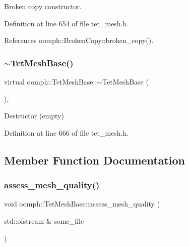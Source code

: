 Broken copy constructor. 



Definition at line 654 of file tet\+\_\+mesh.\+h.



References oomph\+::\+Broken\+Copy\+::broken\+\_\+copy().

\mbox{\label{classoomph_1_1TetMeshBase_a03628ca8bccf0700d39728ba266dae3e}} 
\subsubsection{\texorpdfstring{$\sim$\+Tet\+Mesh\+Base()}{~TetMeshBase()}}
{\footnotesize\ttfamily virtual oomph\+::\+Tet\+Mesh\+Base\+::$\sim$\+Tet\+Mesh\+Base (\begin{DoxyParamCaption}{ }\end{DoxyParamCaption})\hspace{0.3cm}{\ttfamily [inline]}, {\ttfamily [virtual]}}



Destructor (empty) 



Definition at line 666 of file tet\+\_\+mesh.\+h.



\subsection{Member Function Documentation}
\mbox{\label{classoomph_1_1TetMeshBase_aa8b4e18d5f358a5bc64151861d990ca3}} 
\subsubsection{\texorpdfstring{assess\+\_\+mesh\+\_\+quality()}{assess\_mesh\_quality()}}
{\footnotesize\ttfamily void oomph\+::\+Tet\+Mesh\+Base\+::assess\+\_\+mesh\+\_\+quality (\begin{DoxyParamCaption}\item[{std\+::ofstream \&}]{some\+\_\+file }\end{DoxyParamCaption})}



